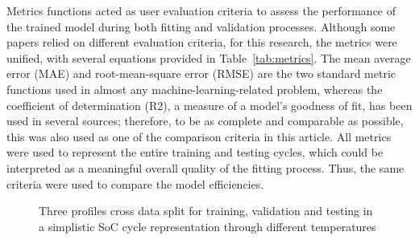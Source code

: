 %
Metrics functions acted as user evaluation criteria to assess the performance of the trained model during both fitting and validation processes.
Although some papers relied on different evaluation criteria, for this research, the metrics were unified, with several equations provided in \mbox{Table~\ref{tab:metrics}}.
The mean average error (MAE) and root-mean-square error (RMSE) are the two standard metric functions used in almost any machine-learning-related problem, whereas the coefficient of determination (R2), a measure of a model's goodness of fit, has been used in several sources; therefore, to be as complete and comparable as possible, this was also used as one of the comparison criteria in this article.
All metrics were used to represent the entire training and testing cycles, which could be interpreted as a meaningful overall quality of the fitting process.
Thus, the same criteria were used to compare the model efficiencies.
\begin{figure}[ht]
    
    \caption{Three profiles cross data split for training, validation and testing in a simplistic SoC cycle representation through different temperatures}
    \label{fig:cross-data}
\end{figure}

\vspace{-18pt}

